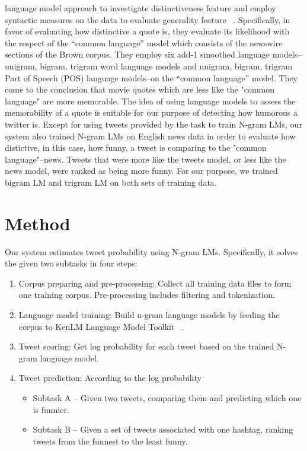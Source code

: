 \documentclass[11pt,a4paper]{article}
\begin{document}
language model approach to investigate distinctiveness feature and employ syntactic measures on the data to evaluate generality feature ~\cite{hello}. Specifically, in favor of evaluating how distinctive a quote is, they evaluate its likelihood with the respect of the “common language” model which consists of the newswire sections of the Brown corpus. They employ six add-1 smoothed language models–unigram, bigram, trigram word language models and unigram, bigram, trigram Part of Speech (POS) language models–on the “common language” model. They come to the conclusion that movie quotes which are less like the "common language" are more memorable. The idea of using language models to assess the memorability of a quote is suitable for our purpose of detecting how humorous a twitter is. Except for using tweets provided by the task to train N-gram LMs, our system also trained N-gram LMs on English news data in order to evaluate how distictive, in this case, how funny, a tweet is comparing to the "common language"--news. Tweets that were more like the tweets model, or less like the news model, were ranked as being more funny. For our purpose, we trained bigram LM and trigram LM on both sets of training data.

\section{Method}
Our system estimates tweet probability using N-gram LMs. Specifically, it solves the given two subtasks in four steps:
\begin{enumerate}
\item Corpus preparing and pre-processing: Collect all training data files to form one training corpus. Pre-processing includes filtering and tokenization.
\item Language model training: Build n-gram language models by feeding the corpus to KenLM Language Model Toolkit ~\cite{Heafield-estimate}. 
\item Tweet scoring: Get log probability for each tweet based on the trained N-gram language model.
\item Tweet prediction: According to the log probability
\begin{itemize}
\item Subtask A -- Given two tweets, comparing them and predicting which one is funnier. 
\item Subtask B -- Given a set of tweets associated with one hashtag, ranking tweets from the funnest to the least funny.
\end{itemize}
\end{enumerate}
\end{document}
